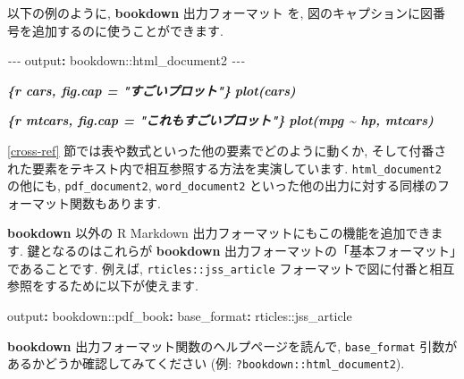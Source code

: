 \documentclass[
  11pt,
  lualatex,
  ja=standard]{bxjsreport}
\newenvironment{Shaded}{\begin{snugshade}}{\end{snugshade}}
\newcommand{\AttributeTok}[1]{\textcolor[rgb]{0.77,0.63,0.00}{#1}}
\newcommand{\FunctionTok}[1]{\textcolor[rgb]{0.00,0.00,0.00}{#1}}
\newcommand{\InformationTok}[1]{\textcolor[rgb]{0.56,0.35,0.01}{\textbf{\textit{#1}}}}
\newcommand{\KeywordTok}[1]{\textcolor[rgb]{0.13,0.29,0.53}{\textbf{#1}}}
\newcommand{\PreprocessorTok}[1]{\textcolor[rgb]{0.56,0.35,0.01}{\textit{#1}}}
\begin{document}
以下の例のように, \textbf{bookdown} \autocite{R-bookdown} 出力フォーマット を, 図のキャプションに図番号を追加するのに使うことができます.

\begin{Shaded}
\begin{Highlighting}[]
\PreprocessorTok{{-}{-}{-}}
\FunctionTok{output}\KeywordTok{:}\AttributeTok{ bookdown::html\_document2}
\PreprocessorTok{{-}{-}{-}}
\end{Highlighting}
\end{Shaded}

\begin{Shaded}
\begin{Highlighting}[]
\InformationTok{\textasciigrave{}\textasciigrave{}\textasciigrave{}\{r cars, fig.cap = "すごいプロット"\}}
\InformationTok{plot(cars)}
\InformationTok{\textasciigrave{}\textasciigrave{}\textasciigrave{}}

\InformationTok{\textasciigrave{}\textasciigrave{}\textasciigrave{}\{r mtcars, fig.cap = "これもすごいプロット"\}}
\InformationTok{plot(mpg \textasciitilde{} hp, mtcars)}
\InformationTok{\textasciigrave{}\textasciigrave{}\textasciigrave{}}
\end{Highlighting}
\end{Shaded}

\ref{cross-ref} 節では表や数式といった他の要素でどのように動くか, そして付番された要素をテキスト内で相互参照する方法を実演しています. \texttt{html\_document2} の他にも, \texttt{pdf\_document2}, \texttt{word\_document2} といった他の出力に対する同様のフォーマット関数もあります.

\textbf{bookdown} 以外の R Markdown 出力フォーマットにもこの機能を追加できます. 鍵となるのはこれらが \textbf{bookdown} 出力フォーマットの「基本フォーマット」であることです. 例えば, \texttt{rticles::jss\_article} フォーマットで図に付番と相互参照をするために以下が使えます.

\begin{Shaded}
\begin{Highlighting}[]
\FunctionTok{output}\KeywordTok{:}
\AttributeTok{  bookdown::pdf\_book}\KeywordTok{:}\FunctionTok{}
\AttributeTok{    }\FunctionTok{base\_format}\KeywordTok{:}\AttributeTok{ rticles::jss\_article}
\end{Highlighting}
\end{Shaded}

\textbf{bookdown} 出力フォーマット関数のヘルプページを読んで, \texttt{base\_format} 引数があるかどうか確認してみてください (例: \texttt{?bookdown::html\_document2}).
\end{document}
